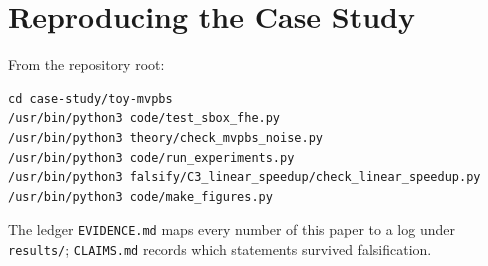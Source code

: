 \section{Reproducing the Case Study}\label{app:repro}
From the repository root:
{\small
\begin{verbatim}
cd case-study/toy-mvpbs
/usr/bin/python3 code/test_sbox_fhe.py
/usr/bin/python3 theory/check_mvpbs_noise.py
/usr/bin/python3 code/run_experiments.py
/usr/bin/python3 falsify/C3_linear_speedup/check_linear_speedup.py
/usr/bin/python3 code/make_figures.py
\end{verbatim}
}
The ledger \texttt{EVIDENCE.md} maps every number of this paper to a log under
\texttt{results/}; \texttt{CLAIMS.md} records which statements survived falsification.
